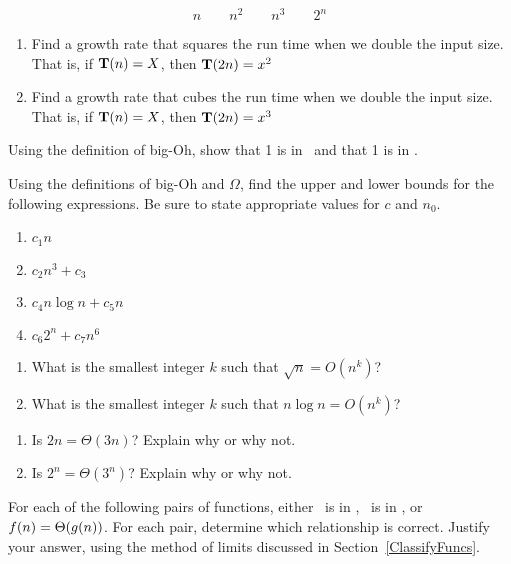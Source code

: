 \begin{exercises}
\vspace{-\bigskipamount}
\[n\qquad n^2\qquad n^3\qquad 2^n\]

\item
\begin{enumerate}
\item
Find a growth rate that squares the run time when we double the input
size.
That is, if \(\mbox{$\textbf{T}(n)$} = X\), then \(\mbox{$\textbf{T}(2n)$} = x^2\)
\item
Find a growth rate that cubes the run time when we double the input
size.
That is, if \(\mbox{$\textbf{T}(n)$} = X\), then \(\mbox{$\textbf{T}(2n)$} = x^3\)
\end{enumerate}

\item
Using the definition of big-Oh, show that 1 is in \Oone\ and that
1 is in \On.

\item
Using the definitions of big-Oh and \(\Omega\), find the upper and
lower bounds for the following expressions.
Be sure to state appropriate values for \(c\) and \(n_0\).

\begin{enumerate}
\item \(c_1 n\)
\item \(c_2 n^3 + c_3\)
\item \(c_4 n \log n + c_5 n\)
\item \(c_6 2^n + c_7 n^6\)
\end{enumerate}

\item
\begin{enumerate}
\item
What is the smallest integer \(k\) such that \(\sqrt{n} = O(n^k)\)?
\item
What is the smallest integer \(k\) such that \(n \log n = O(n^k)\)?
\end{enumerate}

\item
\begin{enumerate}
\item
Is \(2n = \Theta(3n)\)?
Explain why or why not.

\item
Is \(2^n = \Theta(3^n)\)?
Explain why or why not.
\end{enumerate}

\item
For each of the following pairs of functions, either \fn\ is in \Ogn,
\fn\ is in \Omegagn, or \(\mbox{$f(n)$}= \mbox{$\Theta(g(n))$}\).
For each pair, determine which relationship is correct.
Justify your answer, using the method of limits discussed in
Section~\ref{ClassifyFuncs}.


\end{exercises}
